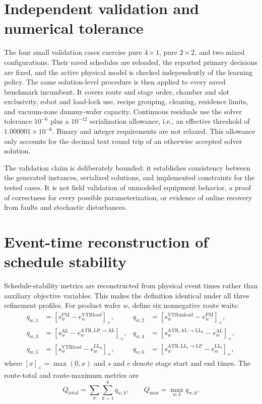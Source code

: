 \documentclass[11pt]{article}
\begin{document}
\section{Independent validation and numerical tolerance}

The four small validation cases exercise pure $4\times1$, pure $2\times2$,
and two mixed configurations. Their saved schedules are reloaded, the reported
primary decisions are fixed, and the active physical model is checked
independently of the learning policy. The same solution-level procedure is
then applied to every saved benchmark incumbent. It covers route and stage
order, chamber and slot exclusivity, robot and load-lock use, recipe grouping,
cleaning, residence limits, and vacuum-zone dummy-wafer capacity. Continuous
residuals use the solver tolerance $10^{-6}$ plus a $10^{-12}$ serialization
allowance, i.e., an effective threshold of
$1.000001\times10^{-6}$. Binary and integer requirements are not relaxed.
This allowance only accounts for the decimal text round trip of an otherwise
accepted solver solution.

The validation claim is deliberately bounded: it establishes consistency
between the generated instances, serialized solutions, and implemented
constraints for the tested cases. It is not field validation of unmodeled
equipment behavior, a proof of correctness for every possible parameterization,
or evidence of online recovery from faults and stochastic disturbances.

\section{Event-time reconstruction of schedule stability}

Schedule-stability metrics are reconstructed from physical event times rather
than auxiliary objective variables. This makes the definition identical under
all three refinement profiles. For product wafer $w$, define six nonnegative
route waits:
\begin{align}
q_{w,1}&=[s^{\mathrm{PM}}_w-e^{\mathrm{VTRload}}_w]_+, &
q_{w,2}&=[s^{\mathrm{VTRunload}}_w-e^{\mathrm{PM}}_w]_+,\\
q_{w,3}&=[s^{\mathrm{AL}}_w-e^{\mathrm{ATR,LP\to AL}}_w]_+, &
q_{w,4}&=[s^{\mathrm{ATR,AL\to LL_u}}_w-e^{\mathrm{AL}}_w]_+,\\
q_{w,5}&=[s^{\mathrm{VTRload}}_w-e^{\mathrm{LL_u}}_w]_+, &
q_{w,6}&=[s^{\mathrm{ATR,LL_l\to LP}}_w-e^{\mathrm{LL_l}}_w]_+,
\end{align}
where $[x]_+=\max(0,x)$ and $s$ and $e$ denote stage start and end times.
The route-total and route-maximum metrics are
\begin{equation}
Q_{\mathrm{total}}=\sum_w\sum_{k=1}^{6}q_{w,k},\qquad
Q_{\max}=\max_{w,k}q_{w,k}.
\end{equation}
\end{document}
